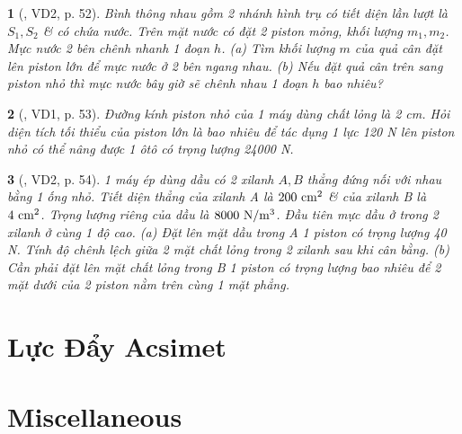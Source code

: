 \documentclass{article}
\newtheorem{baitoan}{}
\begin{document}
\begin{baitoan}[\cite{Van_Quyen_Hanh_Nhu_10_chuyen_Ly}, VD2, p. 52]
	Bình thông nhau gồm 2 nhánh hình trụ có tiết diện lần lượt là $S_1,S_2$ \& có chứa nước. Trên mặt nước có đặt 2 piston mỏng, khối lượng $m_1,m_2$. Mực nước 2 bên chênh nhanh 1 đoạn $h$. (a) Tìm khối lượng $m$ của quả cân đặt lên piston lớn để mực nước ở 2 bên ngang nhau. (b) Nếu đặt quả cân trên sang piston nhỏ thì mực nước bây giờ sẽ chênh nhau 1 đoạn $h$ bao nhiêu?
\end{baitoan}

\begin{baitoan}[\cite{Van_Quyen_Hanh_Nhu_10_chuyen_Ly}, VD1, p. 53]
	Đường kính piston nhỏ của 1 máy dùng chất lỏng là {\rm2 cm}. Hỏi diện tích tối thiểu của piston lớn là bao nhiêu để tác dụng 1 lực {\rm120 N} lên piston nhỏ có thể nâng được 1 ôtô có trọng lượng {\rm24000 N}.
\end{baitoan}

\begin{baitoan}[\cite{Van_Quyen_Hanh_Nhu_10_chuyen_Ly}, VD2, p. 54]
	1 máy ép dùng dầu có 2 xilanh $A,B$ thẳng đứng nối với nhau bằng 1 ống nhỏ. Tiết diện thẳng của xilanh A là $\rm200\ cm^2$ \& của xilanh B là $\rm4\ cm^2$. Trọng lượng riêng của dầu là $\rm8000\ N{\tt/}m^3$. Đầu tiên mực dầu ở trong 2 xilanh ở cùng 1 độ cao. (a) Đặt lên mặt dầu trong A 1 piston có trọng lượng {\rm40 N}. Tính độ chênh lệch giữa 2 mặt chất lỏng trong 2 xilanh sau khi cân bằng. (b) Cần phải đặt lên mặt chất lỏng trong B 1 piston có trọng lượng bao nhiêu để 2 mặt dưới của 2 piston nằm trên cùng 1 mặt phẳng.
\end{baitoan}


\section{Lực Đẩy Acsimet}


\section{Miscellaneous}


\printbibliography[heading=bibintoc]
	
\end{document}
